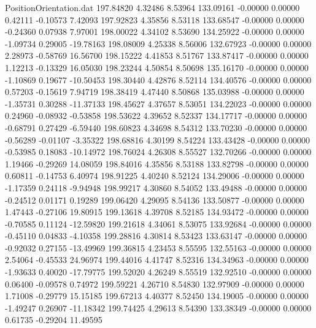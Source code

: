 \begin{filecontents}{PositionOrientation.dat}
 197.84820    4.32486    8.53964   133.09161   -0.00000    0.00000    0.42111   -0.10573    7.42093
 197.92823    4.35856    8.53118   133.68547   -0.00000    0.00000   -0.24360    0.07938    7.97001
 198.00022    4.34102    8.53690   134.25922   -0.00000    0.00000   -1.09734    0.29005  -19.78163
 198.08009    4.25338    8.56006   132.67923   -0.00000    0.00000    2.28973   -0.58769   16.56700
 198.15222    4.41853    8.51767   133.87417   -0.00000    0.00000    1.12213   -0.13329   16.05030
 198.23244    4.50854    8.50698   135.16170   -0.00000    0.00000   -1.10869    0.19677  -10.50453
 198.30440    4.42876    8.52114   134.40576   -0.00000    0.00000    0.57203   -0.15619    7.94719
 198.38419    4.47440    8.50868   135.03988   -0.00000    0.00000   -1.35731    0.30288  -11.37133
 198.45627    4.37657    8.53051   134.22023   -0.00000    0.00000    0.24960   -0.08932   -0.53858
 198.53622    4.39652    8.52337   134.17717   -0.00000    0.00000   -0.68791    0.27429   -6.59440
 198.60823    4.34698    8.54312   133.70230   -0.00000    0.00000   -0.56289   -0.01107   -3.35322
 198.68816    4.30199    8.54224   133.43428   -0.00000    0.00000   -0.53985    0.18083  -10.14972
 198.76024    4.26308    8.55527   132.70266   -0.00000    0.00000    1.19466   -0.29269   14.08059
 198.84016    4.35856    8.53188   133.82798   -0.00000    0.00000    0.60811   -0.14753    6.40974
 198.91225    4.40240    8.52124   134.29006   -0.00000    0.00000   -1.17359    0.24118   -9.94948
 198.99217    4.30860    8.54052   133.49488   -0.00000    0.00000   -0.24512    0.01171    0.19289
 199.06420    4.29095    8.54136   133.50877   -0.00000    0.00000    1.47443   -0.27106   19.80915
 199.13618    4.39708    8.52185   134.93472   -0.00000    0.00000   -0.70585    0.11124  -12.59820
 199.21618    4.34061    8.53075   133.92684   -0.00000    0.00000   -0.45110    0.04833   -4.10358
 199.28816    4.30814    8.53423   133.63147   -0.00000    0.00000   -0.92032    0.27155  -13.49969
 199.36815    4.23453    8.55595   132.55163   -0.00000    0.00000    2.54064   -0.45533   24.96974
 199.44016    4.41747    8.52316   134.34963   -0.00000    0.00000   -1.93633    0.40020  -17.79775
 199.52020    4.26249    8.55519   132.92510   -0.00000    0.00000    0.06400   -0.09578    0.74972
 199.59221    4.26710    8.54830   132.97909   -0.00000    0.00000    1.71008   -0.29779   15.15185
 199.67213    4.40377    8.52450   134.19005   -0.00000    0.00000   -1.49247    0.26907  -11.18342
 199.74425    4.29613    8.54390   133.38349   -0.00000    0.00000    0.61735   -0.29204   11.49595

\end{filecontents}
